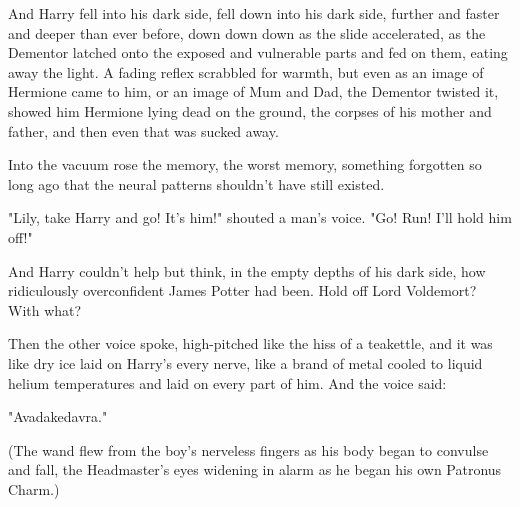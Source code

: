 And Harry fell into his dark side, fell down into his dark side, further and
faster and deeper than ever before, down down down as the slide accelerated, as
the Dementor latched onto the exposed and vulnerable parts and fed on them,
eating away the light. A fading reflex scrabbled for warmth, but even as an
image of Hermione came to him, or an image of Mum and Dad, the Dementor twisted
it, showed him Hermione lying dead on the ground, the corpses of his mother and
father, and then even that was sucked away.

Into the vacuum rose the memory, the worst memory, something forgotten so long
ago that the neural patterns shouldn't have still existed.

\begin{em}
"Lily, take Harry and go! It's him!" shouted a man's voice. "Go! Run!
I'll hold him off!"

And Harry couldn't help but think, in the empty depths of his dark side,
how ridiculously overconfident James Potter had been. Hold off Lord Voldemort?
With what?

Then the other voice spoke, high-pitched like the hiss of a teakettle,
and it was like dry ice laid on Harry's every nerve, like a brand of metal
cooled to liquid helium temperatures and laid on every part of him. And the
voice said:

"Avadakedavra."
\end{em}

(The wand flew from the boy's nerveless fingers as his body began to convulse
and fall, the Headmaster's eyes widening in alarm as he began his own Patronus
Charm.)

